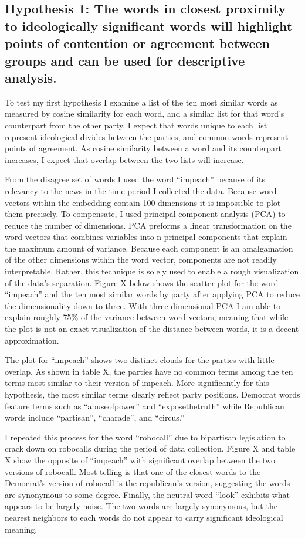 \documentclass[../embeddings.tex]{subfiles}
\begin{document}
\subsection{Hypothesis 1: The words in closest proximity to ideologically significant words will highlight points of contention or agreement between groups and can be used for descriptive analysis.}

To test my first hypothesis I examine a list of the ten most similar words as measured by cosine similarity for each word, and a similar list for that word’s counterpart from the other party. I expect that words unique to each list represent ideological divides between the parties, and common words represent points of agreement. As cosine similarity between a word and its counterpart increases, I expect that overlap between the two lists will increase. 

From the disagree set of words I used the word “impeach” because of its relevancy to the news in the time period I collected the data. Because word vectors within the embedding contain 100 dimensions it is impossible to plot them precisely. To compensate, I used principal component analysis (PCA) to reduce the number of dimensions. PCA preforms a linear transformation on the word vectors that combines variables into n principal components that explain the maximum amount of variance. Because each component is an amalgamation of the other dimensions within the word vector, components are not readily interpretable. Rather, this technique is solely used to enable a rough visualization of the data’s separation. Figure X below shows the scatter plot for the word “impeach” and the ten most similar words by party after applying PCA to reduce the dimensionality down to three. With three dimensional PCA I am able to explain roughly 75\% of the variance between word vectors, meaning that while the plot is not an exact visualization of the distance between words, it is a decent approximation.

The plot for “impeach” shows two distinct clouds for the parties with little overlap. As shown in table X, the parties have no common terms among the ten terms most similar to their version of impeach. More significantly for this hypothesis, the most similar terms clearly reflect party positions. Democrat words feature terms such as “abuseofpower” and “exposethetruth” while Republican words include “partisan”, “charade”, and “circus.”

I repeated this process for the word “robocall” due to bipartisan legislation to crack down on robocalls during the period of data collection. Figure X and table X show the opposite of “impeach” with significant overlap between the two versions of robocall. Most telling is that one of the closest words to the Democrat’s version of robocall is the republican’s version, suggesting the words are synonymous to some degree. 
Finally, the neutral word “look” exhibits what appears to be largely noise. The two words are largely synonymous, but the nearest neighbors to each words do not appear to carry significant ideological meaning.
\end{document}

